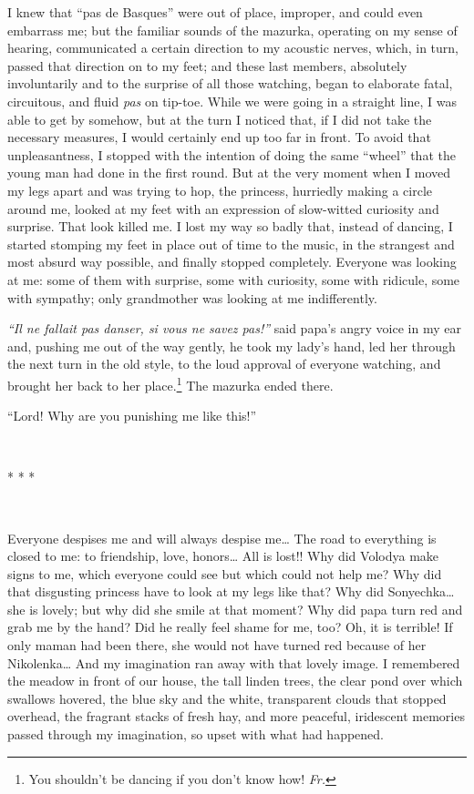 I knew that ``pas de Basques'' were out of place, improper, and could even embarrass me; but the familiar sounds of the mazurka, operating on my sense of hearing, communicated a certain direction to my acoustic nerves, which, in turn, passed that direction on to my feet; and these last members, absolutely involuntarily and to the surprise of all those watching, began to elaborate fatal, circuitous, and fluid \textit{pas} on tip-toe. While we were going in a straight line, I was able to get by somehow, but at the turn I noticed that, if I did not take the necessary measures, I would certainly end up too far in front. To avoid that unpleasantness, I stopped with the intention of doing the same ``wheel'' that the young man had done in the first round. But at the very moment when I moved my legs apart and was trying to hop, the princess, hurriedly making a circle around me, looked at my feet with an expression of slow-witted curiosity and surprise. That look killed me. I lost my way so badly that, instead of dancing, I started stomping my feet in place out of time to the music, in the strangest and most absurd way possible, and finally stopped completely. Everyone was looking at me: some of them with surprise, some with curiosity, some with ridicule, some with sympathy; only grandmother was looking at me indifferently.

\textit{``Il ne fallait pas danser, si vous ne savez pas!''} said papa's angry voice in my ear and, pushing me out of the way gently, he took my lady's hand, led her through the next turn in the old style, to the loud approval of everyone watching, and brought her back to her place.\footnote{You shouldn't be dancing if you don't know how! \textit{Fr.}} The mazurka ended there. %

``Lord! Why are you punishing me like this!'' %

~

\centerline{* * *}

~

Everyone despises me and will always despise me\ldots{} The road to everything is closed to me: to friendship, love, honors\ldots{} All is lost!! Why did Volodya make signs to me, which everyone could see but which could not help me? Why did that disgusting princess have to look at my legs like that? Why did Sonyechka\ldots{}she is lovely; but why did she smile at that moment? Why did papa turn red and grab me by the hand? Did he really feel shame for me, too? Oh, it is terrible! If only maman had been there, she would not have turned red because of her Nikolenka\ldots{} And my imagination ran away with that lovely image. I remembered the meadow in front of our house, the tall linden trees, the clear pond over which swallows hovered, the blue sky and the white, transparent clouds that stopped overhead, the fragrant stacks of fresh hay, and more peaceful, iridescent memories passed through my imagination, so upset with what had happened.

